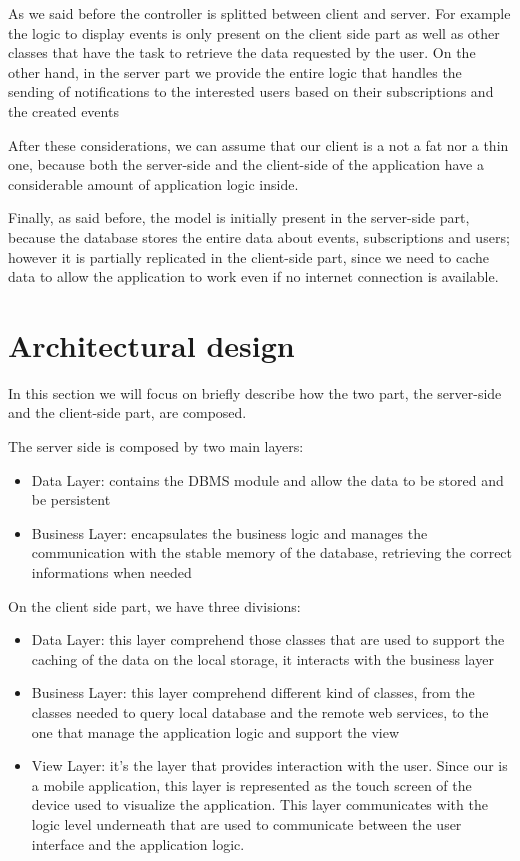 \documentclass[a4paper]{scrreprt}
\begin{document}
\par As we said before the controller is splitted between client and server. For example the logic to display events is only present on the client side part as well as other classes that have the task to retrieve the data requested by the user. On the other hand, in the server part we provide the entire logic that handles the sending of notifications to the interested users based on their subscriptions and the created events
\par After these considerations, we can assume that our client is a not a fat nor a thin one, because both the server-side and the client-side of the application have a considerable amount of application logic inside.
\par Finally, as said before, the model is initially present in the server-side part, because the database stores the entire data about events, subscriptions and users; however it is partially replicated in the client-side part, since we need to cache data to allow the application to work even if no internet connection is available.

\section{Architectural design}
In this section we will focus on briefly describe how the two part, the server-side and the client-side part, are composed.
\par The server side is composed by two main layers:
\begin{itemize}
\item Data Layer: contains the DBMS module and allow the data to be stored and be persistent
\item Business Layer: encapsulates the business logic and manages the communication with the stable memory of the database, retrieving the correct informations when needed
\end{itemize}

\par On the client side part, we have three divisions:
\begin{itemize}
\item Data Layer: this layer comprehend those classes that are used to support the caching of the data on the local storage, it interacts with the business layer
\item Business Layer: this layer comprehend different kind of classes, from the classes needed to query local database and the remote web services, to the one that manage the application logic and support the view 
\item View Layer: it's the layer that provides interaction with the user. Since our is a mobile application, this layer is represented as the touch screen of the device used to visualize the application. This layer communicates with the logic level underneath that are used to communicate between the user interface and the application logic.
\end{itemize}
\end{document}
